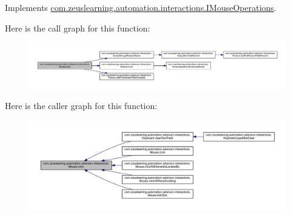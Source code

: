 Implements \hyperlink{interfacecom_1_1zeuslearning_1_1automation_1_1interactions_1_1IMouseOperations_a644236cb97197227ac80084abb3d95b0}{com.\+zeuslearning.\+automation.\+interactions.\+I\+Mouse\+Operations}.

Here is the call graph for this function\+:
\nopagebreak
\begin{figure}[H]
\begin{center}
\leavevmode
\includegraphics[width=350pt]{d0/dfa/classcom_1_1zeuslearning_1_1automation_1_1selenium_1_1interactions_1_1Mouse_a60a08540de50836519b5a6e2b0dc40fe_cgraph}
\end{center}
\end{figure}
Here is the caller graph for this function\+:
\nopagebreak
\begin{figure}[H]
\begin{center}
\leavevmode
\includegraphics[width=350pt]{d0/dfa/classcom_1_1zeuslearning_1_1automation_1_1selenium_1_1interactions_1_1Mouse_a60a08540de50836519b5a6e2b0dc40fe_icgraph}
\end{center}
\end{figure}
\hypertarget{classcom_1_1zeuslearning_1_1automation_1_1selenium_1_1interactions_1_1Mouse_ab765bba8173f469709da14c8c636fe1e}{}\label{classcom_1_1zeuslearning_1_1automation_1_1selenium_1_1interactions_1_1Mouse_ab765bba8173f469709da14c8c636fe1e} 
